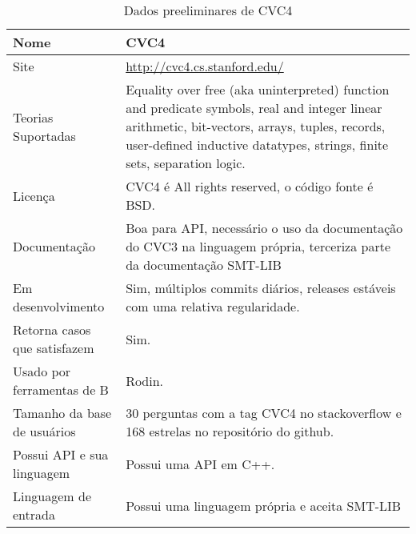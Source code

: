 \begin{table}[!h]
  \centering
  \begin{tabular}{ | l | p{10cm} |}
    \hline
	Nome & CVC4 \\ \hline
    Site & \url{http://cvc4.cs.stanford.edu/} \\ \hline 
    Teorias Suportadas & Equality over free (aka uninterpreted) function and predicate symbols, real and integer linear arithmetic, bit-vectors, arrays, tuples, records, user-defined inductive datatypes, strings, finite sets, separation logic.\\ \hline
    Licença & CVC4 é All rights reserved, o código fonte é BSD. \\ \hline
    Documentação & Boa para API, necessário o uso da documentação do CVC3 na linguagem própria, terceriza parte da documentação SMT-LIB \\ \hline
    Em desenvolvimento & Sim, múltiplos commits diários, releases estáveis com uma relativa regularidade. \\ \hline
    Retorna casos que satisfazem & Sim. \\ \hline
    Usado por ferramentas de B & Rodin. \\ \hline
    Tamanho da base de usuários &  30 perguntas com a tag CVC4 no stackoverflow e 168 estrelas no repositório do github. \\ \hline
    Possui API e sua linguagem & Possui uma API em C++. \\ \hline
    Linguagem de entrada & Possui uma linguagem própria e aceita SMT-LIB \\ \hline
  \end{tabular}
  \caption{Dados preeliminares de CVC4 }
  \label{tab:LABEL_TAB_3}
\end{table}

\FloatBarrier

